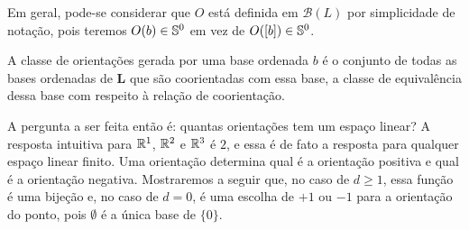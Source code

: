 Em geral, pode-se considerar que $O$ está definida em $\mathcal{B}(L)$ por simplicidade de notação, pois teremos $O(b) \in \S^0$ em vez de $O([b]) \in \S^0$.

A classe de orientações gerada por uma base ordenada $b$ é o conjunto de todas as bases ordenadas de $\bm L$ que são coorientadas com essa base, a classe de equivalência dessa base com respeito à relação de coorientação. 

A pergunta a ser feita então é: quantas orientações tem um espaço linear? A resposta intuitiva para $\R^1$, $\R^2$ e $\R^3$ é $2$, e essa é de fato a resposta para qualquer espaço linear finito. Uma orientação determina qual é a orientação positiva e qual é a orientação negativa. Mostraremos a seguir que, no caso de $d \geq 1$, essa função é uma bijeção e, no caso de $d=0$, é uma escolha de $+1$ ou $-1$ para a orientação do ponto, pois $\emptyset$ é a única base de $\{0\}$.

